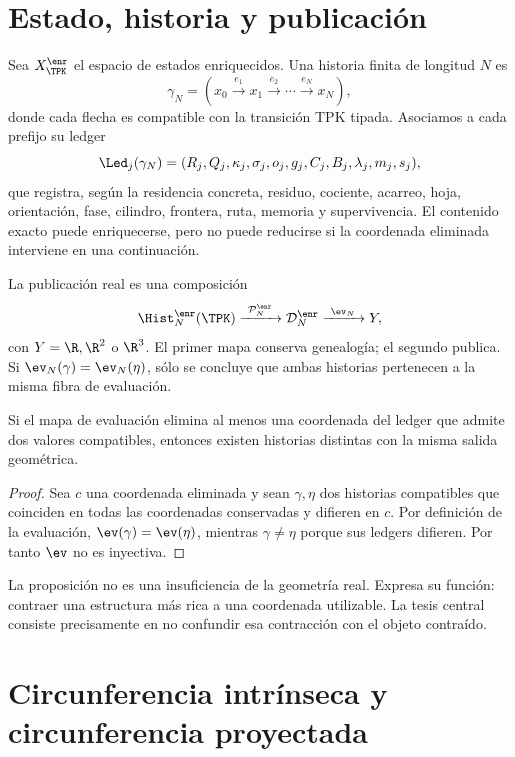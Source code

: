 \section{Estado, historia y publicación}

Sea \(X_{\TPK}^{\enr}\) el espacio de estados enriquecidos. Una historia
finita de longitud \(N\) es
\[
 \gamma_N=(x_0\xrightarrow{e_1}x_1\xrightarrow{e_2}\cdots
 \xrightarrow{e_N}x_N),
\]
donde cada flecha es compatible con la transición TPK tipada. Asociamos a
cada prefijo su ledger
\[
 \Led_j(\gamma_N)=
 (R_j,Q_j,\kappa_j,\sigma_j,o_j,g_j,C_j,B_j,
  \lambda_j,m_j,s_j),
\]
que registra, según la residencia concreta, residuo, cociente, acarreo,
hoja, orientación, fase, cilindro, frontera, ruta, memoria y supervivencia.
El contenido exacto puede enriquecerse, pero no puede reducirse si la
coordenada eliminada interviene en una continuación.

La publicación real es una composición
\[
 \Hist_N^{\enr}(\TPK)
 \xrightarrow{\ \mathcal P_N^{\enr}\ }
 \mathcal D_N^{\enr}
 \xrightarrow{\ \ev_N\ }
 Y,
\]
con \(Y=\R,\R^2\) o \(\R^3\). El primer mapa conserva genealogía; el
segundo publica. Si \(\ev_N(\gamma)=\ev_N(\eta)\), sólo se concluye que
ambas historias pertenecen a la misma fibra de evaluación.

\begin{proposition}
Si el mapa de evaluación elimina al menos una coordenada del ledger que
admite dos valores compatibles, entonces existen historias distintas con la
misma salida geométrica.
\end{proposition}
\begin{proof}
Sea \(c\) una coordenada eliminada y sean \(\gamma,\eta\) dos historias
compatibles que coinciden en todas las coordenadas conservadas y difieren en
\(c\). Por definición de la evaluación, \(\ev(\gamma)=\ev(\eta)\), mientras
\(\gamma\neq\eta\) porque sus ledgers difieren. Por tanto \(\ev\) no es
inyectiva.
\end{proof}

La proposición no es una insuficiencia de la geometría real. Expresa su
función: contraer una estructura más rica a una coordenada utilizable. La
tesis central consiste precisamente en no confundir esa contracción con el
objeto contraído.

\section{Circunferencia intrínseca y circunferencia proyectada}

